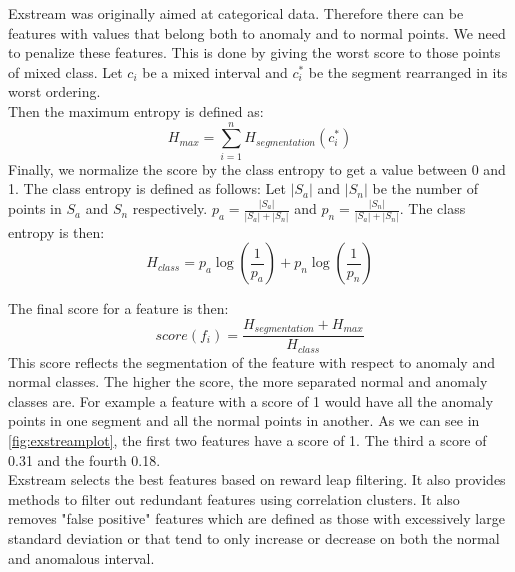 \documentclass[oneside, a4paper, onecolumn, 11pt]{article}
\begin{document}
Exstream was originally aimed at categorical data. Therefore there can be features with values that belong both to anomaly and to normal points. We need to penalize these features. This is done by giving the worst score to those points of mixed class. Let $c_i$ be a mixed interval and $c_i^*$ be the segment rearranged in its worst ordering.\\
Then the maximum entropy is defined as:
\begin{equation}
    H_{max} = \sum_{i=1}^{n} H_{segmentation}(c_i^*)
\end{equation}
Finally, we normalize the score by the class entropy to get a value between 0 and 1. The class entropy is defined as follows:
Let $|S_a|$ and $|S_n|$ be the number of points in $S_a$ and $S_n$ respectively. $p_a = \frac{|S_a|}{|S_a| + |S_n|}$ and $p_n = \frac{|S_n|}{|S_a| + |S_n|}$. The class entropy is then:
\begin{equation}
    H_{class} = p_a \log(\frac{1}{p_a}) + p_n \log(\frac{1}{p_n})
\end{equation}

The final score for a feature is then:
\begin{equation}
    score(f_i) = \frac{H_{segmentation} + H_{max}}{H_{class}}
\end{equation}
This score reflects the segmentation of the feature with respect to anomaly and normal classes. The higher the score, the more separated normal and anomaly classes are. For example a feature with a score of 1 would have all the anomaly points in one segment and all the normal points in another. As we can see in \autoref{fig:exstreamplot}, the first two features have a score of 1. The third a score of 0.31 and the fourth 0.18.\\
Exstream selects the best features based on reward leap filtering. It also provides methods to filter out redundant features using correlation clusters. It also removes "false positive" features which are defined as those with excessively large standard deviation or that tend to only increase or decrease on both the normal and anomalous interval.\\
\end{document}
